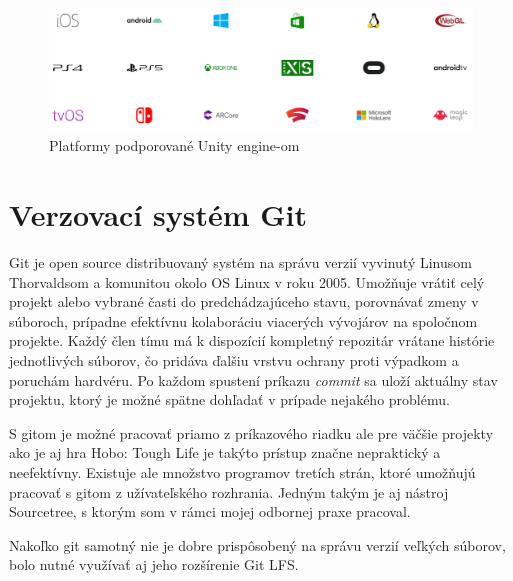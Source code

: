 \documentclass[slovak, bachelorpractice]{diploma}
\begin{document}
\begin{figure}[!htbp]
	\centering
	\includegraphics[width=1\textwidth]{Pictures/platforms.png}
	\caption{Platformy podporované Unity engine-om \cite{UnityMultiplatform}}
	\label{pic:UnityPlatforms}
\end{figure}

\section{Verzovací systém Git}
\label{sec:Git}
Git \cite{ProGit} je open source distribuovaný systém na správu verzií vyvinutý Linusom Thorvaldsom a komunitou okolo OS Linux v roku 2005. Umožňuje vrátiť celý projekt alebo vybrané časti do predchádzajúceho stavu, porovnávať zmeny v súboroch, prípadne efektívnu kolaboráciu viacerých vývojárov na spoločnom projekte. Každý člen tímu má k dispozícií kompletný repozitár vrátane histórie jednotlivých súborov, čo pridáva ďalšiu vrstvu ochrany proti výpadkom a poruchám hardvéru. Po každom spustení príkazu \textit{commit} sa uloží aktuálny stav projektu, ktorý je možné spätne dohľadať v prípade nejakého problému.

S gitom je možné pracovať priamo z príkazového riadku ale pre väčšie projekty ako je aj hra Hobo: Tough Life je takýto prístup značne nepraktický a neefektívny. Existuje ale množstvo programov tretích strán, ktoré umožňujú pracovať s gitom z užívateľského rozhrania. Jedným takým je aj nástroj Sourcetree, s ktorým som v rámci mojej odbornej praxe pracoval.

Nakoľko git samotný nie je dobre prispôsobený na správu verzií veľkých súborov, bolo nutné využívať aj jeho rozšírenie Git LFS. 
\end{document}
